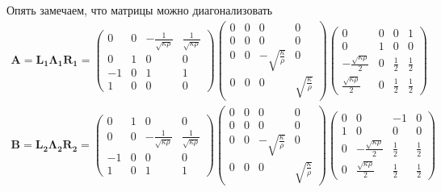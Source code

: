 Опять замечаем, что матрицы можно диагонализовать
\begin{gather*}
	\bm{A} = \bm{L_1} \bm{\Lambda_1} \bm{R_1} = 
	\begin{pmatrix}
    	0 & 0 & -\frac{1}{\sqrt{\kappa\rho}} & \frac{1}{\sqrt{\kappa\rho}} \\
    	0 & 1 & 0 & 0 \\
        -1 & 0 & 1 & 1 \\
    	1 & 0 & 0 & 0
	\end{pmatrix} 
	\begin{pmatrix}
    	0 & 0 & 0 & 0 \\
    	0 & 0 & 0 & 0 \\
        0 & 0 & -\sqrt{\frac{\kappa}{\rho}} & 0 \\
    	0 & 0 & 0 & \sqrt{\frac{\kappa}{\rho}}
	\end{pmatrix} 
	\begin{pmatrix}
    	0 & 0 & 0 & 1 \\
    	0 & 1 & 0 & 0 \\
        -\frac{\sqrt{\kappa\rho}}{2} & 0 & \frac{1}{2} & \frac{1}{2} \\
        \frac{\sqrt{\kappa\rho}}{2} & 0 & \frac{1}{2} & \frac{1}{2}
	\end{pmatrix} \\
	\bm{B} = \bm{L_2} \bm{\Lambda_2} \bm{R_2} = 
	\begin{pmatrix}
    	0 & 1 & 0 & 0 \\
    	0 & 0 & -\frac{1}{\sqrt{\kappa\rho}} & \frac{1}{\sqrt{\kappa\rho}} \\
    	-1 & 0 & 0 & 0 \\
        1 & 0 & 1 & 1 
	\end{pmatrix} 
	\begin{pmatrix}
    	0 & 0 & 0 & 0 \\
    	0 & 0 & 0 & 0 \\
        0 & 0 & -\sqrt{\frac{\kappa}{\rho}} & 0 \\
    	0 & 0 & 0 & \sqrt{\frac{\kappa}{\rho}}
	\end{pmatrix} 
	\begin{pmatrix}
    	0 & 0 & -1 & 0 \\
    	1 & 0 & 0 & 0 \\
        0 & -\frac{\sqrt{\kappa\rho}}{2} & \frac{1}{2} & \frac{1}{2} \\
        0 & \frac{\sqrt{\kappa\rho}}{2}  & \frac{1}{2} & \frac{1}{2}
	\end{pmatrix} 
\end{gather*}

